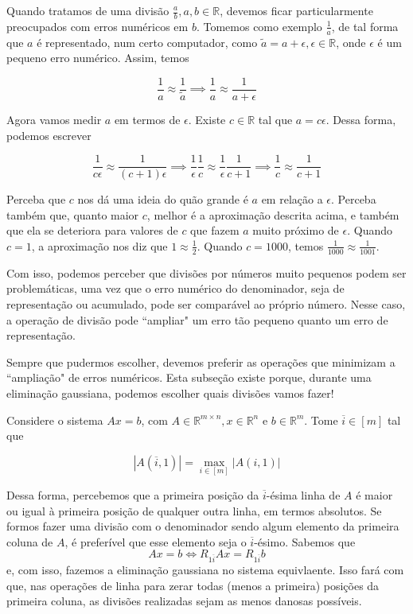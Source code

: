 \documentclass[]{article}
\numberwithin{equation}{section}
\begin{document}
Quando tratamos de uma divisão $\frac{a}{b}, a, b \in \mathbb{R}$, devemos ficar particularmente preocupados com erros numéricos em $b$. Tomemos como exemplo $\frac{1}{a}$, de tal forma que $a$ é representado, num certo computador, como $\tilde{a} = a + \epsilon, \epsilon \in \mathbb{R}$, onde $\epsilon$ é um pequeno erro numérico. Assim, temos

$$
\frac{1}{a} \approx \frac{1}{\tilde{a}} \implies \frac{1}{a} \approx \frac{1}{a + \epsilon}
$$

Agora vamos medir $a$ em termos de $\epsilon$. Existe $c \in \mathbb{R}$ tal que $a = c \epsilon$. Dessa forma, podemos escrever

$$
\frac{1}{c \epsilon} \approx \frac{1}{(c + 1) \epsilon} \implies \frac{1}{\epsilon} \frac{1}{c} \approx \frac{1}{\epsilon} \frac{1}{c + 1} \implies \frac{1}{c} \approx \frac{1}{c + 1}
$$

Perceba que $c$ nos dá uma ideia do quão grande é $a$ em relação a $\epsilon$. Perceba também que, quanto maior $c$, melhor é a aproximação descrita acima, e também que ela se deteriora para valores de $c$ que fazem $a$ muito próximo de $\epsilon$. Quando $c = 1$, a aproximação nos diz que $1 \approx \frac{1}{2}$. Quando $c = 1000$, temos $\frac{1}{1000} \approx \frac{1}{1001}$.

Com isso, podemos perceber que divisões por números muito pequenos podem ser problemáticas, uma vez que o erro numérico do denominador, seja de representação ou acumulado, pode ser comparável ao próprio número. Nesse caso, a operação de divisão pode ``ampliar" um erro tão pequeno quanto um erro de representação.

Sempre que pudermos escolher, devemos preferir as operações que minimizam a ``ampliação" de erros numéricos. Esta subseção existe porque, durante uma eliminação gaussiana, podemos escolher quais divisões vamos fazer!

Considere o sistema $Ax = b$, com $A \in \mathbb{R}^{m \times n}, x \in \mathbb{R}^n$ e $b \in \mathbb{R}^m$. Tome $\overline{i} \in [m]$ tal que

$$
|A(\overline{i}, 1)| = \max_{i \in [m]} |A(i, 1)|
$$

Dessa forma, percebemos que a primeira posição da $\overline{i}$-ésima linha de $A$ é maior ou igual à primeira posição de qualquer outra linha, em termos absolutos. Se formos fazer uma divisão com o denominador sendo algum elemento da primeira coluna de $A$, é preferível que esse elemento seja o $\overline{i}$-ésimo. Sabemos que
$$
Ax = b \iff R_{1\overline{i}}Ax = R_{1\overline{i}}b
$$
e, com isso, fazemos a eliminação gaussiana no sistema equivlaente. Isso fará com que, nas operações de linha para zerar todas (menos a primeira) posições da primeira coluna, as divisões realizadas sejam as menos danosas possíveis.
\end{document}
